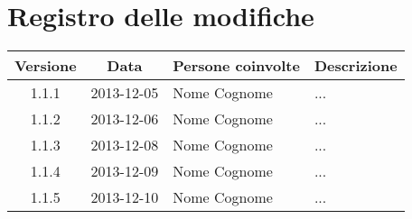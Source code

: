\section*{Registro delle modifiche}

\small{
\begin{tabularx}{\textwidth}{|c|c|l|X|}
 \hline \textbf{Versione} & \textbf{Data} & \textbf{Persone coinvolte} & \textbf{Descrizione} \\
 
 \hline 1.1.1 & 2013-12-05 & Nome Cognome &
 ...\\

 \hline 1.1.2 & 2013-12-06 & Nome Cognome &
 ...\\

 \hline 1.1.3 & 2013-12-08 & Nome Cognome &
 ...\\

 \hline 1.1.4 & 2013-12-09 & Nome Cognome &
 ...\\

 \hline 1.1.5 & 2013-12-10 & Nome Cognome &
 ...\\

 \hline
\end{tabularx}
}
